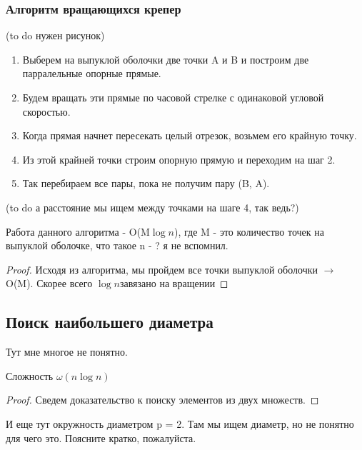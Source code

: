 \subsubsection{Алгоритм вращающихся крепер} 
(to do нужен рисунок)
\begin{enumerate}
	\item Выберем на выпуклой оболочки две точки A и B и построим две парралельные опорные прямые.  
	\item Будем вращать эти прямые по часовой стрелке с одинаковой угловой скоростью.
	\item Когда прямая начнет пересекать целый отрезок, возьмем его крайную точку.
	\item Из этой крайней точки строим опорную прямую и переходим на шаг 2.
	\item Так перебираем все пары, пока не получим пару (B, A).    
\end{enumerate}
(to do а расстояние мы ищем между точками на шаге 4, так ведь?)

\begin{statement}
Работа данного алгоритма - O(M$\log{n}$), где M - это количество точек на выпуклой оболочке, что такое n - ? я не вспомнил. 
\begin{proof}
Исходя из алгоритма, мы пройдем все точки выпуклой оболочки $\longrightarrow$ O(M).
Скорее всего $\log{n}$завязано на вращении 
\end{proof}
\end{statement}

\subsection[title]{Поиск наибольшего диаметра}
Тут мне многое не понятно. 

\begin{statement}
Сложность $\omega(n\log{n})$
\begin{proof}
Сведем доказательство к поиску элементов из двух множеств. 
\end{proof}
\end{statement}

И еще тут окружность диаметром p = 2. Там мы ищем диаметр, но не понятно для чего это. Поясните кратко, пожалуйста. 
